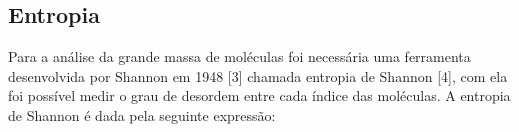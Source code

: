 \subsection{Entropia}

Para a análise da grande massa de moléculas foi necessária uma ferramenta
desenvolvida por Shannon em 1948 [3] chamada entropia de Shannon [4], com ela foi
possível medir o grau de desordem entre cada índice das moléculas. A entropia de
Shannon é dada pela seguinte expressão:

